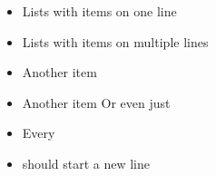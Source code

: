 \documentclass{article}
\begin{document}
\begin{itemize}

  \item Lists with items on one line

  \item Lists with items
    on multiple lines

  \item Another item

  \item Another item
    Or even just %

  \item Every
  \item should start a new line

\end{itemize}
\end{document}

